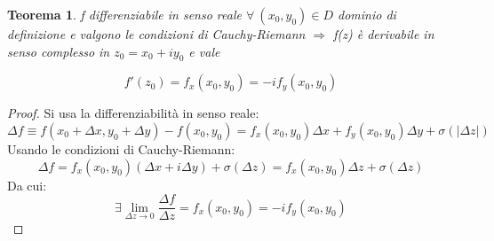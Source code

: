 \documentclass[twoside]{article}
\newtheorem{theorem}{Teorema}[section]
\begin{document}
\begin{theorem}
f differenziabile in senso reale $\forall\ (x_0,y_0) \in D$ dominio di definizione e valgono le condizioni di Cauchy-Riemann $\Longrightarrow$ f(z) è derivabile in senso complesso in $z_0=x_0+iy_0$ e vale 
\end{theorem}
\begin{equation}
	f'(z_0)=f_x(x_0,y_0)=-if_y(x_0,y_0)
\end{equation}
\begin{proof} Si usa la differenziabilità in senso reale:
    \begin{equation}
        \Delta f\equiv f(x_0+\Delta x, y_0+\Delta y)-f(x_0,y_0)=f_x(x_0,y_0)\Delta x+ f_y(x_0,y_0)\Delta y+ \sigma (|\Delta z|)
    \end{equation}
    Usando le condizioni di Cauchy-Riemann:
    \begin{equation}
        \Delta f=f_x(x_0,y_0)(\Delta x+i\Delta y)+\sigma(\Delta z)=f_x(x_0,y_0)\Delta z+\sigma(\Delta z)
    \end{equation}
    Da cui:
    \begin{equation}
        \exists \lim_{\Delta z\to 0}\frac{\Delta f}{\Delta z}=f_x(x_0,y_0)=-if_y(x_0,y_0)
    \end{equation}
\end{proof}
\end{document}
